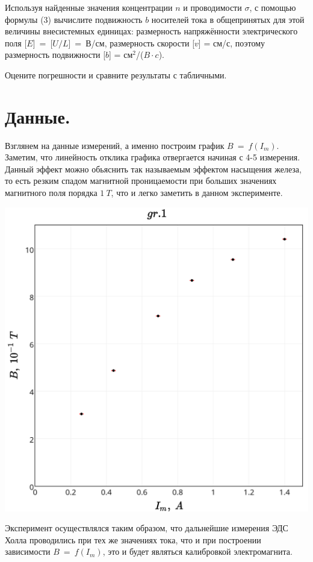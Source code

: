  Используя найденные значения концентрации $n$ и проводимости $\sigma$, с помощью формулы (3) вычислите подвижность $b$ носителей тока в общепринятых для этой величины внесистемных единицах: размерность напряжённости электрического поля [$E$]~=~[$U/L$]~=~В/см, размерность скорости [$v$] = см/с, поэтому размерность подвижности [$b$] = $\text{см}^2$/($B \cdot c$).
 
Оцените погрешности и сравните результаты с табличными.

\section{\label{sec:level1}Данные.}

Взглянем на данные измерений, а именно построим график $B~=~f(I_m)$. Заметим, что линейность отклика графика отвергается начиная с 4-5 измерения. Данный эффект можно обьяснить так называемым эффектом насыщения железа, то есть резким спадом магнитной проницаемости при больших значениях магнитного поля порядка $1~T$, что и легко заметить в данном эксперименте.

\includegraphics[scale = 0.20]{my_plot1.png}

Эксперимент осуществлялся таким образом, что дальнейшие измерения ЭДС Холла проводились при тех же значениях тока, что и при построении зависимости $B~=~f(I_m)$, это и будет являться калибровкой электромагнита.

